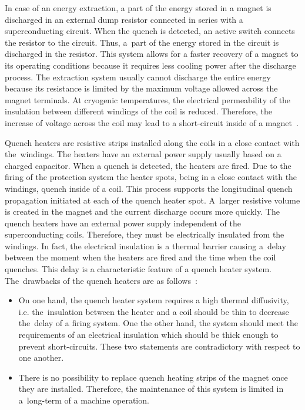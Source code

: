 In case of an energy extraction, a part of the energy stored in a magnet is discharged in an external dump resistor connected in series with a superconducting circuit. When the quench is detected, an active switch connects the resistor to the circuit. Thus, a~part of the energy stored in the circuit is discharged in the resistor. This system allows for a faster recovery of a magnet to its operating conditions because it requires less cooling power after the discharge process. The extraction system usually cannot discharge the entire energy because its resistance is limited by the maximum voltage allowed across the magnet terminals. At cryogenic temperatures, the electrical permeability of the insulation between different windings of the coil is reduced. Therefore, the increase of voltage across the coil may lead to a short-circuit inside of a magnet~\cite{salmiquenchheateroptimization}. 

Quench heaters are resistive strips installed along the coils in a close contact with the~windings. The heaters have an external power supply usually based on a charged capacitor. When a quench is detected, the heaters are fired. Due to the firing of the protection system the heater spots, being in a close contact with the windings, quench inside of a coil. This process supports the longitudinal quench propagation initiated at each of the quench heater spot. A~larger resistive volume is created in the magnet and the current discharge occurs more quickly. The quench heaters have an external power supply independent of the superconducting coils. Therefore, they must be electrically insulated from the windings. In fact, the electrical insulation is a thermal barrier causing a~delay between the moment when the heaters are fired and the time when the coil quenches. This delay is a characteristic feature of a quench heater system. The~drawbacks of the quench heaters are as follows~\cite{salmiquenchheateroptimization}: 

\begin{itemize}
    \item On one hand, the quench heater system requires a high thermal diffusivity, i.e. the~insulation between the heater and a coil should be thin to decrease the~delay of a firing system. One the other hand, the system should meet the requirements of an electrical insulation which should be thick enough to prevent short-circuits. These two statements are contradictory with respect to one another. 
	\item There is no possibility to replace quench heating strips of the magnet once they are installed. Therefore, the maintenance of this system is limited in a~long-term of a machine operation. 
\end{itemize}

